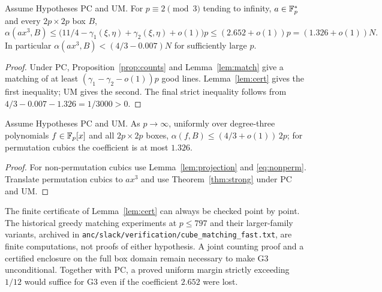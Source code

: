 \begin{theorem}\label{thm:strong}
Assume Hypotheses PC and UM.  For $p\equiv2\pmod3$ tending to infinity, $a\in\mathbb{F}_p^*$ and every $2p\times2p$ box $B$,
\[
 \alpha(ax^3,B)\le\bigl(11/4-\gamma_1(\xi,\eta)+\gamma_2(\xi,\eta)+o(1)\bigr)p
 \le(2.652+o(1))p=(1.326+o(1))N.
\]
In particular $\alpha(ax^3,B)<(4/3-0.007)N$ for sufficiently large $p$.
\end{theorem}
\begin{proof}
Under PC, Proposition~\ref{prop:counts} and Lemma~\ref{lem:match} give a matching of at least
$(\gamma_1-\gamma_2-o(1))p$ good lines.  Lemma~\ref{lem:cert} gives the first inequality; UM gives the second.
The final strict inequality follows from $4/3-0.007-1.326=1/3000>0$.
\end{proof}

\begin{corollary}\label{cor:g3}
Assume Hypotheses PC and UM.  As $p\to\infty$, uniformly over degree-three polynomials $f\in\mathbb{F}_p[x]$ and all $2p\times2p$ boxes,
$\alpha(f,B)\le(4/3+o(1))\,2p$; for permutation cubics the coefficient is at most $1.326$.
\end{corollary}
\begin{proof}
For non-permutation cubics use Lemma~\ref{lem:projection} and \eqref{eq:nonperm}.
Translate permutation cubics to $ax^3$ and use Theorem~\ref{thm:strong} under PC and UM.
\end{proof}

\begin{remark}
The finite certificate of Lemma~\ref{lem:cert} can always be checked point by point.
The historical greedy matching experiments at $p\le797$ and their larger-family variants, archived in
\texttt{anc/slack/verification/cube\_matching\_fast.txt}, are finite computations, not proofs of either hypothesis.
A joint counting proof and a certified enclosure on the full box domain remain necessary to make G3 unconditional.
Together with PC, a proved uniform margin strictly exceeding $1/12$ would suffice for G3 even if the coefficient $2.652$ were lost.
\end{remark}
